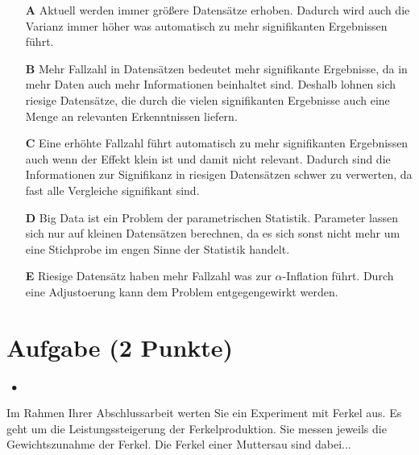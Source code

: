 \documentclass[a4paper, 9pt]{scrartcl}\usepackage[]{graphicx}\usepackage[]{xcolor}
\begin{document}
\begin{enumerate}
\item [\textbf{A} \msquare] Aktuell werden immer größere Datensätze erhoben. Dadurch wird auch die Varianz immer höher was automatisch zu mehr signifikanten Ergebnissen führt.
\item [\textbf{B} \msquare] Mehr Fallzahl in Datensätzen bedeutet mehr signifikante Ergebnisse, da in mehr Daten auch mehr Informationen beinhaltet sind. Deshalb lohnen sich riesige Datensätze, die durch die vielen signifikanten Ergebnisse auch eine Menge an relevanten Erkenntnissen liefern.
\item [\textbf{C} \msquare] Eine erhöhte Fallzahl führt automatisch zu mehr signifikanten Ergebnissen auch wenn der Effekt klein ist und damit nicht relevant. Dadurch sind die Informationen zur Signifikanz in riesigen Datensätzen schwer zu verwerten, da fast alle Vergleiche signifikant sind.
\item [\textbf{D} \msquare] Big Data ist ein Problem der parametrischen Statistik. Parameter lassen sich nur auf kleinen Datensätzen berechnen, da es sich sonst nicht mehr um eine Stichprobe im engen Sinne der Statistik handelt.
\item [\textbf{E} \msquare] Riesige Datensätz haben mehr Fallzahl was zur $\alpha$-Inflation führt. Durch eine Adjustoerung kann dem Problem entgegengewirkt werden.
\end{enumerate}

\section{Aufgabe \hfill (2 Punkte)}

\ifcollection
\begin{flushright}
\tiny\vspace{-2Ex}
\textbf{\examinhaltstart}
\exammodulestatversuch $\;\bullet$
\exammodulebiostat
\vspace{-1Ex}
\end{flushright}
\fi




Im Rahmen Ihrer Abschlussarbeit werten Sie ein Experiment mit Ferkel aus. Es geht um die Leistungssteigerung der Ferkelproduktion. Sie messen jeweils die Gewichtszunahme der Ferkel. Die Ferkel einer Muttersau sind dabei...
\end{document}

